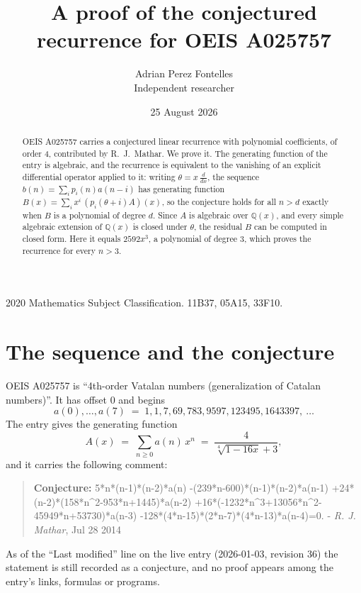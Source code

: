 \documentclass[11pt,a4paper]{article}
\title{A proof of the conjectured recurrence for OEIS A025757}
\author{Adrian Perez Fontelles\\ \small Independent researcher}
\date{25 August 2026}
\theoremstyle{plain}
\theoremstyle{definition}
\begin{document}
\maketitle

\begin{abstract}
OEIS A025757 carries a conjectured linear recurrence with polynomial coefficients, of
order 4, contributed by R.~J.~Mathar. We prove it. The generating function of the
entry is algebraic, and the recurrence is equivalent to the vanishing of an explicit
differential operator applied to it: writing $\theta=x\,\frac{d}{dx}$, the sequence
$b(n)=\sum_{i}p_{i}(n)a(n-i)$ has generating function
$B(x)=\sum_{i}x^{i}\,(p_{i}(\theta+i)A)(x)$, so the conjecture holds for all $n>d$ exactly
when $B$ is a polynomial of degree $d$. Since $A$ is algebraic over $\mathbb{Q}(x)$, and every simple
algebraic extension of $\mathbb{Q}(x)$ is closed under $\theta$, the residual $B$ can be
computed in closed form. Here it equals $2592 x^{3}$, a polynomial of degree $3$, which proves
the recurrence for every $n>3$.
\end{abstract}

\noindent\small 2020 Mathematics Subject Classification. 11B37, 05A15, 33F10.\normalsize

\section{The sequence and the conjecture}

OEIS A025757 is ``4th-order Vatalan numbers (generalization of Catalan numbers)''. It has offset $0$ and begins
\[
a(0),\dots,a(7)\;=\;1, 1, 7, 69, 783, 9597, 123495, 1643397,\ \dots
\]
The entry gives the generating function
\begin{equation}\label{eq:gf}
A(x)\;=\;\sum_{n\ge 0} a(n)\,x^{n}\;=\;\frac{4}{\sqrt[4]{1 - 16 x} + 3} ,
\end{equation}
and it carries the following comment:
\begin{quote}\small
\textbf{Conjecture:} 5*n*(n-1)*(n-2)*a(n) -(239*n-600)*(n-1)*(n-2)*a(n-1) +24*(n-2)*(158*n\textasciicircum{}2-953*n+1445)*a(n-2) +16*(-1232*n\textasciicircum{}3+13056*n\textasciicircum{}2-45949*n+53730)*a(n-3) -128*(4*n-15)*(2*n-7)*(4*n-13)*a(n-4)=0. - \emph{R. J. Mathar}, Jul 28 2014
\end{quote}
As of the ``Last modified'' line on the live entry (2026-01-03, revision 36) the
statement is still recorded as a conjecture, and no proof appears among the entry's links,
formulas or programs.
\end{document}
